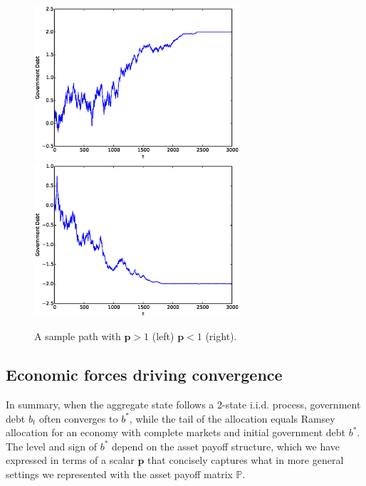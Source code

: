 \documentclass[12pt]{article}
\begin{document}
\begin{figure}
	\begin{center}
	\includegraphics[width=3in]{Images/port1.eps}
	\includegraphics[width=3in]{Images/port2.eps}
\caption{A sample path with $\bm p > 1$ (left)  $\bm{p} <1$ (right).\label{fig:2ps_figure}}
	\end{center}
\end{figure}

\subsection{Economic forces driving convergence}
In summary, when the aggregate state follows a 2-state i.i.d. process, government debt  $b_t$ often converges to $b^*$, while
the tail of the allocation equals  Ramsey allocation for an economy with complete markets and initial government  debt $b^*$.
  The level  and sign of $b^*$ depend on the asset payoff structure, which we have  expressed in terms of a  scalar
  $\bm{p}$ that concisely captures what in more general settings we represented with the asset payoff matrix $\mathbb{P}$.
\end{document}
